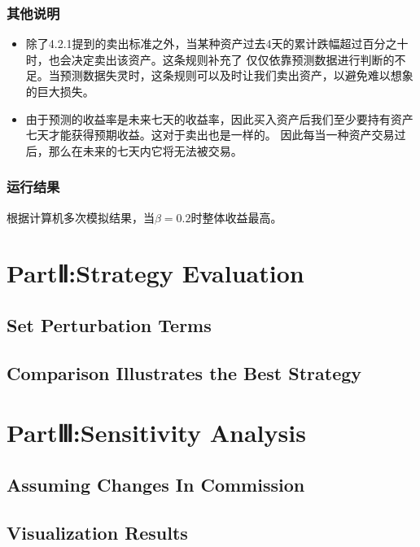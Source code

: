 \documentclass{mcmthesis}
\begin{document}
\subsubsection{其他说明}
\begin{itemize}
  \item 除了4.2.1提到的卖出标准之外，当某种资产过去4天的累计跌幅超过百分之十时，也会决定卖出该资产。这条规则补充了
  仅仅依靠预测数据进行判断的不足。当预测数据失灵时，这条规则可以及时让我们卖出资产，以避免难以想象的巨大损失。
  \item 由于预测的收益率是未来七天的收益率，因此买入资产后我们至少要持有资产七天才能获得预期收益。这对于卖出也是一样的。
  因此每当一种资产交易过后，那么在未来的七天内它将无法被交易。

\end{itemize}
\subsubsection{运行结果}
根据计算机多次模拟结果，当$\beta =0.2$时整体收益最高。





\section{PartⅡ:Strategy Evaluation}
\subsection{Set Perturbation Terms }%

\subsection{Comparison Illustrates the Best Strategy}




\section{PartⅢ:Sensitivity Analysis}
\subsection{Assuming Changes In Commission}

\subsection{Visualization Results}%
\end{document}
